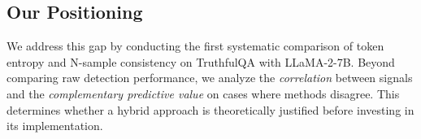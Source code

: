 \subsection{Our Positioning}

We address this gap by conducting the first systematic comparison of token entropy and N-sample consistency on TruthfulQA with LLaMA-2-7B. Beyond comparing raw detection performance, we analyze the \emph{correlation} between signals and the \emph{complementary predictive value} on cases where methods disagree. This determines whether a hybrid approach is theoretically justified before investing in its implementation.
